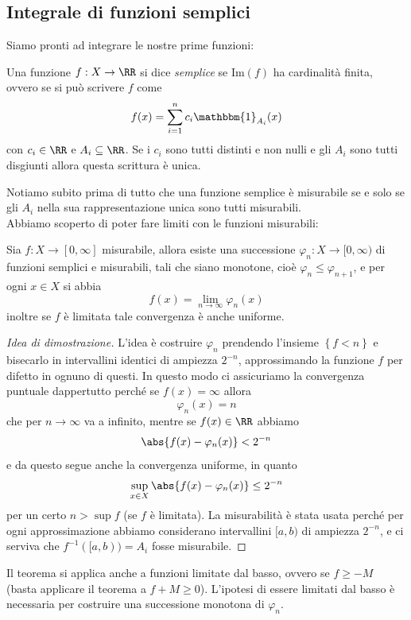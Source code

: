 \documentclass[11pt]{scrartcl}
\newcommand{\Immagine}[1]{\text{Im}\left(#1\right)}
\begin{document}
	\subsection{Integrale di funzioni semplici}
	Siamo pronti ad integrare le nostre prime funzioni:
	\begin{definition}
		Una funzione $f:X\to\RR$ si dice \textit{semplice} se $\Immagine{f}$ ha cardinalità finita, ovvero se si può scrivere $f$ come
		$$f(x)=\sum_{i=1}^{n}c_i\mathbbm{1}_{A_i}(x)$$
		con $c_i\in\RR$ e $A_i\subseteq \RR$. Se i $c_i$ sono tutti distinti e non nulli e gli $A_i$ sono tutti disgiunti allora questa scrittura è unica.
	\end{definition}
	Notiamo subito prima di tutto che una funzione semplice è misurabile se e solo se gli $A_i$ nella sua rappresentazione unica sono tutti misurabili. \\
	Abbiamo scoperto di poter fare limiti con le funzioni misurabili:
	\begin{theorem}
		Sia $f:X\to [0,\infty]$ misurabile, allora esiste una successione $\varphi_n:X\to[0,\infty)$ di funzioni semplici e misurabili, tali che siano monotone, cioè $\varphi_n\le \varphi_{n+1}$, e per ogni $x\in X$ si abbia
		$$f(x)=\lim_{n\to\infty}\varphi_n(x)$$
		inoltre se $f$ è limitata tale convergenza è anche uniforme. 
	\end{theorem}
	\begin{proof}[Idea di dimostrazione]
		L'idea è costruire $\varphi_n$ prendendo l'insieme $\left\{f<n\right\}$ e bisecarlo in intervallini identici di ampiezza $2^{-n}$, approssimando la funzione $f$ per difetto in ognuno di questi. In questo modo ci assicuriamo la convergenza puntuale dappertutto perché se $f(x)=\infty$ allora 
		$$\varphi_n(x)=n$$
		che per $n\to\infty$ va a infinito, mentre se $f(x)\in\RR$ abbiamo
		$$\abs{f(x)-\varphi_n(x)}<2^{-n}$$
		e da questo segue anche la convergenza uniforme, in quanto
		$$\sup_{x\in X}\abs{f(x)-\varphi_n(x)}\le 2^{-n}$$
		per un certo $n>\sup f$ (se $f$ è limitata). La misurabilità è stata usata perché per ogni approssimazione abbiamo considerano intervallini $[a,b)$ di ampiezza $2^{-n}$, e ci serviva che $f^{-1}([a,b))=A_i$ fosse misurabile.
	\end{proof}
	Il teorema si applica anche a funzioni limitate dal basso, ovvero se $f\ge -M$ (basta applicare il teorema a $f+M\ge 0$). L'ipotesi di essere limitati dal basso è necessaria per costruire una successione monotona di $\varphi_n$. \\
\end{document}
